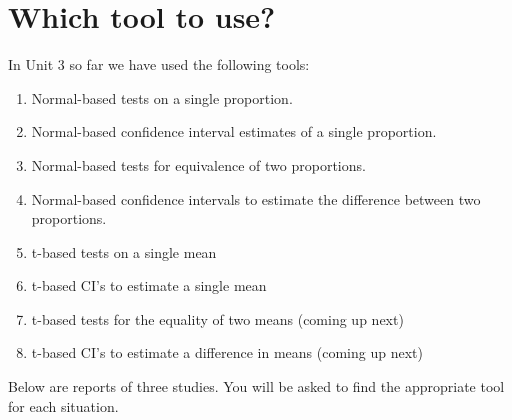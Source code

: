 \def\theTopic{Reading 21 }

\section{  Which tool to use?}


In Unit 3 so far we have used the following tools:
\begin{enumerate}
\item Normal-based tests on a single proportion.
\item Normal-based confidence interval estimates of a single proportion.
\item Normal-based tests for equivalence of two proportions.
\item Normal-based confidence intervals to estimate the difference
  between two proportions.
\item t-based tests on a single mean
\item t-based CI's to estimate a single mean
\item t-based tests for the equality of two means  (coming up next)
\item t-based CI's to estimate a difference in means (coming up next)
\end{enumerate}

Below are reports of three studies. You will be asked to find the
appropriate tool for each situation.


